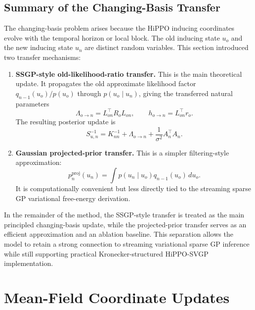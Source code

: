 \documentclass[12pt]{article}
\begin{document}
\subsection{Summary of the Changing-Basis Transfer}
\label{subsec:changing_basis_summary}

The changing-basis problem arises because the HiPPO inducing coordinates evolve with the
temporal horizon or local block. The old inducing state \(u_o\) and the new inducing
state \(u_n\) are distinct random variables. This section introduced two transfer
mechanisms:
\begin{enumerate}[label=(\arabic*)]
    \item \textbf{SSGP-style old-likelihood-ratio transfer.} This is the main
    theoretical update. It propagates the old approximate likelihood factor
    \(q_{n-1}(u_o)/p(u_o)\) through \(p(u_o\mid u_n)\), giving the transferred natural
    parameters
    \begin{equation}
        \Lambda_{o\rightarrow n}
        =
        L_{on}^\top R_oL_{on},
        \qquad
        h_{o\rightarrow n}
        =
        L_{on}^\top r_o .
    \end{equation}
    The resulting posterior update is
    \begin{equation}
        S_{u,n}^{-1}
        =
        K_{nn}^{-1}
        +
        \Lambda_{o\rightarrow n}
        +
        \frac{1}{\sigma^2}A_n^\top A_n .
    \end{equation}

    \item \textbf{Gaussian projected-prior transfer.} This is a simpler filtering-style
    approximation:
    \begin{equation}
        p_n^{\mathrm{proj}}(u_n)
        =
        \int
        p(u_n\mid u_o)q_{n-1}(u_o)\,du_o .
    \end{equation}
    It is computationally convenient but less directly tied to the streaming sparse GP
    variational free-energy derivation.
\end{enumerate}

In the remainder of the method, the SSGP-style transfer is treated as the main principled
changing-basis update, while the projected-prior transfer serves as an efficient
approximation and an ablation baseline. This separation allows the model to retain a
strong connection to streaming variational sparse GP inference while still supporting
practical Kronecker-structured HiPPO-SVGP implementation.

\section{Mean-Field Coordinate Updates}
\label{sec:mean_field_coordinate_updates}
\end{document}
